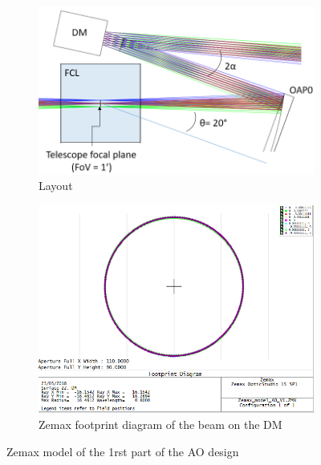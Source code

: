 \documentclass[12pt,a4paper]{article}
\begin{document}
\begin{figure}[H]
\begin{subfigure}[b]{0.45\textwidth}
	\begin{center}
		\includegraphics[width=\linewidth]{images/FP_OAP0.PNG}
		\caption{Layout}\label{fig:FP_OAP0}
	\end{center}
\end{subfigure}
\begin{subfigure}[b]{0.45\textwidth}
\begin{center}
		\includegraphics[width=\linewidth]{images/DM_beam_footprint.PNG}
		\caption{Zemax footprint diagram of the beam on the DM}\label{fig:DM_beam_footprint}
	\end{center}
\end{subfigure}
\caption{Zemax model of the 1rst part of the AO design}
\end{figure}
\end{document}
